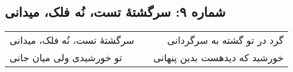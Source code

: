 \begin{center}
\section*{شماره ۹: سرگشتۀ تست، نُه فلک، میدانی}
\label{sec:009}
\begin{longtable}{l p{0.5cm} r}
سرگشتهٔ تست، نُه فلک، میدانی
&&
گرد در تو گشته به سرگردانی
\\
تو خورشیدی ولی میان جانی
&&
خورشید که دیدهست بدین پنهانی
\\
\end{longtable}
\end{center}
